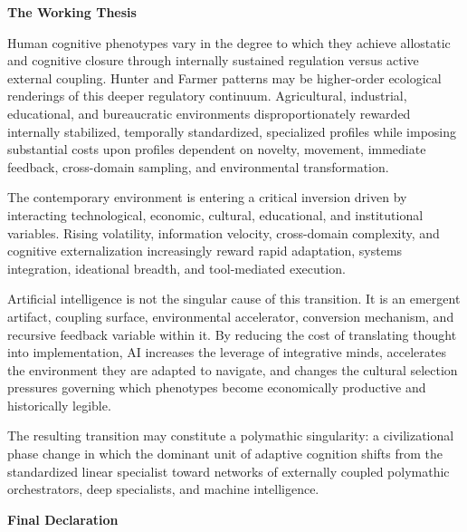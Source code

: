 \documentclass[10pt]{article}
\newcommand{\ActiveAccent}{Industrial}
\newcommand{\papersection}[2]{%
  \Needspace{8\baselineskip}
  \vspace{1.1em}
  \noindent\begin{minipage}[t]{0.12\textwidth}
    \vspace{1pt}{\sffamily\bfseries\fontsize{17}{17}\selectfont\textcolor{\ActiveAccent}{#1}}
  \end{minipage}%
  \begin{minipage}[t]{0.86\textwidth}
    {\sffamily\bfseries\fontsize{16.2}{19}\selectfont #2}\par
    \vspace{0.35em}{\color{\ActiveAccent}\rule{\linewidth}{1.15pt}}
  \end{minipage}
  \vspace{0.55em}
}
\begin{document}
\papersection{XII}{The Working Thesis}

Human cognitive phenotypes vary in the degree to which they achieve allostatic and cognitive closure through internally sustained regulation versus active external coupling. Hunter and Farmer patterns may be higher-order ecological renderings of this deeper regulatory continuum. Agricultural, industrial, educational, and bureaucratic environments disproportionately rewarded internally stabilized, temporally standardized, specialized profiles while imposing substantial costs upon profiles dependent on novelty, movement, immediate feedback, cross-domain sampling, and environmental transformation.

The contemporary environment is entering a critical inversion driven by interacting technological, economic, cultural, educational, and institutional variables. Rising volatility, information velocity, cross-domain complexity, and cognitive externalization increasingly reward rapid adaptation, systems integration, ideational breadth, and tool-mediated execution.

Artificial intelligence is not the singular cause of this transition. It is an emergent artifact, coupling surface, environmental accelerator, conversion mechanism, and recursive feedback variable within it. By reducing the cost of translating thought into implementation, AI increases the leverage of integrative minds, accelerates the environment they are adapted to navigate, and changes the cultural selection pressures governing which phenotypes become economically productive and historically legible.

The resulting transition may constitute a polymathic singularity: a civilizational phase change in which the dominant unit of adaptive cognition shifts from the standardized linear specialist toward networks of externally coupled polymathic orchestrators, deep specialists, and machine intelligence.

\papersection{XIII}{Final Declaration}
\end{document}
